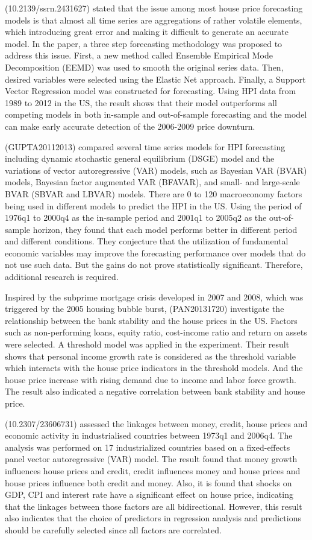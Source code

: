 \documentclass[11pt]{article}
\begin{document}
(10.2139/ssrn.2431627) stated that the issue among most house price forecasting models is that almost all time series are aggregations of rather volatile elements, which introducing great error and making it difficult to generate an accurate model. In the paper, a three step forecasting methodology was proposed to address this issue. First, a new method called Ensemble Empirical Mode Decomposition (EEMD) was used to smooth the original series data. Then, desired variables were selected using the Elastic Net approach. Finally, a Support Vector Regression model was constructed for forecasting. Using HPI data from 1989 to 2012 in the US, the result shows that their model outperforms all competing models in both in-sample and out-of-sample forecasting and the model can make early accurate detection of the 2006-2009 price downturn.

(GUPTA20112013) compared several time series models for HPI forecasting including dynamic stochastic general equilibrium (DSGE) model and the variations of vector autoregressive (VAR) models, such as Bayesian VAR (BVAR) models, Bayesian factor augmented VAR (BFAVAR), and small- and large-scale BVAR (SBVAR and LBVAR) models. There are 0 to 120 macroeconomy factors being used in different models to predict the HPI in the US. Using the period of 1976q1 to 2000q4 as the in-sample period and 2001q1 to 2005q2 as the out-of-sample horizon, they found that each model performs better in different period and different conditions. They conjecture that the utilization of fundamental economic variables may improve the forecasting performance over models that do not use such data. But the gains do not prove statistically significant. Therefore, additional research is required.

Inspired by the subprime mortgage crisis developed in 2007 and 2008, which was triggered by the 2005 housing bubble burst, (PAN20131720) investigate the relationship between the bank stability and the house prices in the US. Factors such as non-performing loans, equity ratio, cost-income ratio and return on assets were selected. A threshold model was applied in the experiment. Their result shows that personal income growth rate is considered as the threshold variable which interacts with the house price indicators in the threshold models. And the house price increase with rising demand due to income and labor force growth. The result also indicated a negative correlation between bank stability and house price.

(10.2307/23606731) assessed the linkages between money, credit, house prices and economic activity in industrialised countries between 1973q1 and 2006q4. The analysis was performed on 17 industrialized countries based on a fixed-effects panel vector autoregressive (VAR) model. The result found that money growth influences house prices and credit, credit influences money and house prices and house prices influence both credit and money. Also, it is found that shocks on GDP, CPI and interest rate have a significant effect on house price, indicating that the linkages between those factors are all bidirectional. However, this result also indicates that the choice of predictors in regression analysis and predictions should be carefully selected since all factors are correlated.
\end{document}

